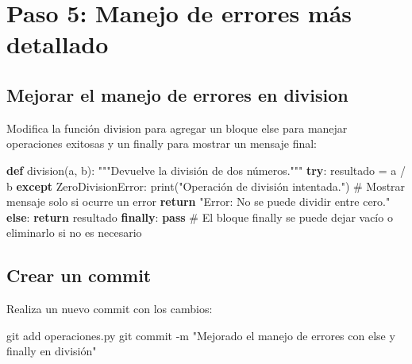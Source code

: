 \documentclass[
  a4paper,
  DIV=11,
  numbers=noendperiod,
  onepage,
  openany]{scrreprt}
\newenvironment{Shaded}{\begin{snugshade}}{\end{snugshade}}
\newcommand{\AttributeTok}[1]{\textcolor[rgb]{0.40,0.45,0.13}{#1}}
\newcommand{\BuiltInTok}[1]{\textcolor[rgb]{0.00,0.23,0.31}{#1}}
\newcommand{\CommentTok}[1]{\textcolor[rgb]{0.37,0.37,0.37}{#1}}
\newcommand{\ControlFlowTok}[1]{\textcolor[rgb]{0.00,0.23,0.31}{\textbf{#1}}}
\newcommand{\FunctionTok}[1]{\textcolor[rgb]{0.28,0.35,0.67}{#1}}
\newcommand{\KeywordTok}[1]{\textcolor[rgb]{0.00,0.23,0.31}{\textbf{#1}}}
\newcommand{\NormalTok}[1]{\textcolor[rgb]{0.00,0.23,0.31}{#1}}
\newcommand{\OperatorTok}[1]{\textcolor[rgb]{0.37,0.37,0.37}{#1}}
\newcommand{\PreprocessorTok}[1]{\textcolor[rgb]{0.68,0.00,0.00}{#1}}
\newcommand{\StringTok}[1]{\textcolor[rgb]{0.13,0.47,0.30}{#1}}
\begin{document}
\section{Paso 5: Manejo de errores más
detallado}\label{paso-5-manejo-de-errores-muxe1s-detallado}

\subsection{Mejorar el manejo de errores en
division}\label{mejorar-el-manejo-de-errores-en-division}

Modifica la función division para agregar un bloque else para manejar
operaciones exitosas y un finally para mostrar un mensaje final:

\begin{Shaded}
\begin{Highlighting}[]
\KeywordTok{def}\NormalTok{ division(a, b):}
    \CommentTok{"""Devuelve la división de dos números."""}
    \ControlFlowTok{try}\NormalTok{:}
\NormalTok{        resultado }\OperatorTok{=}\NormalTok{ a }\OperatorTok{/}\NormalTok{ b}
    \ControlFlowTok{except} \PreprocessorTok{ZeroDivisionError}\NormalTok{:}
        \BuiltInTok{print}\NormalTok{(}\StringTok{"Operación de división intentada."}\NormalTok{)  }\CommentTok{\# Mostrar mensaje solo si ocurre un error}
        \ControlFlowTok{return} \StringTok{"Error: No se puede dividir entre cero."}
    \ControlFlowTok{else}\NormalTok{:}
        \ControlFlowTok{return}\NormalTok{ resultado}
    \ControlFlowTok{finally}\NormalTok{:}
        \ControlFlowTok{pass}  \CommentTok{\# El bloque finally se puede dejar vacío o eliminarlo si no es necesario}
\end{Highlighting}
\end{Shaded}

\subsection{Crear un commit}\label{crear-un-commit-3}

Realiza un nuevo commit con los cambios:

\begin{Shaded}
\begin{Highlighting}[]
\FunctionTok{git}\NormalTok{ add operaciones.py}
\FunctionTok{git}\NormalTok{ commit }\AttributeTok{{-}m} \StringTok{"Mejorado el manejo de errores con else y finally en división"}
\end{Highlighting}
\end{Shaded}
\end{document}
